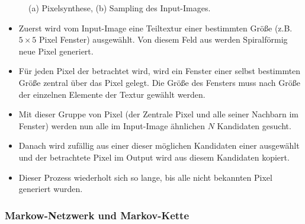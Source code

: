\documentclass[12pt, a4paper,twoside,openright]{report} %
\begin{document}
\begin{figure}[H]
    \centering
    \qquad
    \caption{(a) Pixelsynthese, (b) Sampling des Input-Images.}%
\end{figure}


\begin{itemize}
    \item Zuerst wird vom Input-Image eine Teiltextur einer bestimmten Größe {(z.B. $5\times 5$ Pixel Fenster)} ausgewählt. Von diesem Feld aus werden Spiralförmig neue Pixel generiert.
    \item Für jeden Pixel der betrachtet wird, wird ein Fenster einer selbst bestimmten Größe zentral über das Pixel gelegt.
    Die Größe des Fensters muss nach Größe der einzelnen Elemente der Textur gewählt werden.
    \item Mit dieser Gruppe von Pixel {(der Zentrale Pixel und alle seiner Nachbarn im Fenster)} werden nun alle im Input-Image ähnlichen $N$ Kandidaten gesucht.
    \item Danach wird zufällig aus einer dieser möglichen Kandidaten einer ausgewählt und der betrachtete Pixel im Output wird aus diesem Kandidaten kopiert.
    \item Dieser Prozess wiederholt sich so lange, bis alle nicht bekannten Pixel generiert wurden. \cite[S.4]{GomathiShah2009}
\end{itemize}

\subsubsection{Markow-Netzwerk und Markov-Kette}
\end{document}
